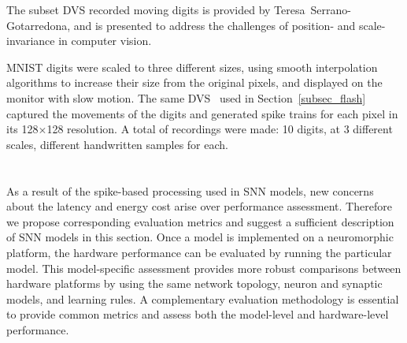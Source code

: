 The subset \DIFdelbegin {}\DIFdelend \DIFaddbegin {}\DIFaddend DVS recorded moving digits is provided by \DIFdelbegin {}\DIFdelend Teresa~Serrano-Gotarredona, and is  presented to address the challenges of position- and scale- invariance in computer vision.
\DIFdelbegin %

\DIFdelend MNIST digits were scaled to three different sizes, using smooth interpolation algorithms to increase their size from the original \DIFdelbegin {}\DIFdelend \DIFaddbegin {}\DIFaddend pixels, and displayed on the monitor with slow motion. 
The same DVS~\citep{serrano2013128} used in Section~\ref{subsec_flash} captured the movements of the digits and generated spike trains for each pixel in its 128$\times$128 resolution.
A total of \DIFdelbegin {}\DIFdelend \DIFaddbegin {}\DIFaddend recordings were made: 10 digits, at 3 different scales, \DIFdelbegin {}\DIFdelend \DIFaddbegin {}\DIFaddend different handwritten samples for each.

\DIFdelbegin \subsection{}
\addtocounter{subsection}{-1}%
\DIFdelend \DIFaddbegin \section{}
\DIFaddend \label{sec:eval}
As a result of the spike-based processing used in SNN models, new concerns about the latency and energy cost arise over performance assessment.
Therefore we propose corresponding evaluation metrics and suggest a sufficient description of SNN models in this section.
Once a model is implemented on a neuromorphic platform, the hardware performance can be evaluated by running the particular model.
This model-specific assessment provides more robust comparisons between hardware platforms by using the same network topology, neuron and synaptic models, and learning rules. 
A complementary evaluation methodology is essential to provide common metrics and assess both the model-level and hardware-level performance.


\DIFdelbegin \subsubsection{}
\addtocounter{subsubsection}{-1}%
\DIFdelend \DIFaddbegin \subsection{}
\DIFaddend \label{subsec:model}

